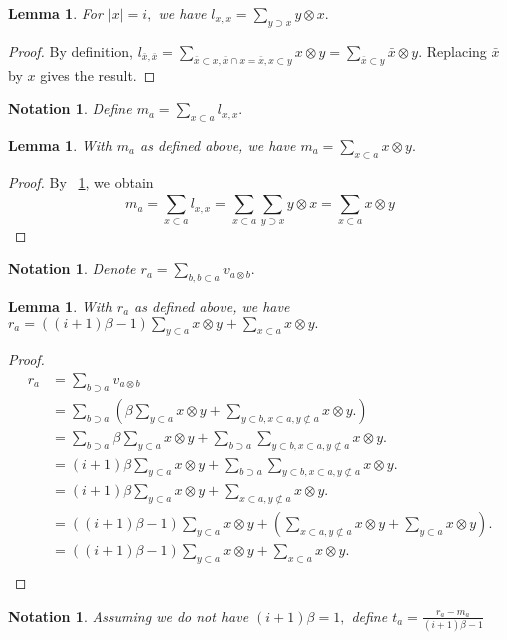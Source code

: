 \documentclass{amsart}
\newtheorem{lem}[subsubsection]{Lemma}
\newtheorem{note}[subsubsection]{Notation}
\begin{document}
\begin{lem}
\label{l_diag_equivalence}
For $|x| = i,$ we have $l_{x,x} = \sum_{y \supset x}^{}y\otimes x.$
\end{lem}
\begin{proof}
By definition, $l_{\bar x,\bar x} = \sum_{\bar x\subset x,\bar x \cap x = \bar x,x\subset y}^{}x\otimes y = \sum_{\bar x\subset y}^{}\bar x\otimes y.$ Replacing $\bar x$ by $x$ gives the result.
\end{proof}

\begin{note}
Define $m_a = \sum_{x \subset a}^{}l_{x,x}.$
\end{note}

\begin{lem}
\label{m_equivalence}
With $m_a$ as defined above, we have $m_a = \sum_{x\subset a}^{}x\otimes y.$
\end{lem}
\begin{proof}
By ~\ref{l_diag_equivalence}, we obtain
$$m_a = \sum_{x \subset a}^{}l_{x,x} = \sum_{x \subset a}^{}\sum_{y \supset x}^{}y\otimes x= \sum_{x\subset a}^{}x\otimes y$$
\end{proof}

\begin{note}
Denote $r_a = \sum_{b,b\subset a}^{} v_{a \otimes b}.$
\end{note}

\begin{lem}
\label{r_equivalence}
With $r_a$ as defined above, we have $r_a = ((i+1)\beta-1)\sum_{y\subset a}^{}x\otimes y +\sum_{x\subset a}^{}x\otimes y.$
\end{lem}
\begin{proof}
\begin{align*}
	r_a &= \sum_{b\supset a}^{}v_{a\otimes b}\\
	&=\sum_{b\supset a}^{} \left(\beta \sum_{y \subset a}^{}x \otimes y + \sum_{y\subset b,x \subset a,y\not\subset a}^{}x\otimes y.\right)\\
	&= \sum_{b\supset a}^{} \beta \sum_{y \subset a}^{}x \otimes y + \sum_{b\supset a}^{} \sum_{y\subset b,x \subset a,y\not\subset a}^{}x\otimes y.\\
	&= (i+1)\beta \sum_{y \subset a}^{}x \otimes y + \sum_{b\supset a}^{} \sum_{y\subset b,x \subset a,y\not\subset a}^{}x\otimes y.\\
	&= (i+1)\beta \sum_{y \subset a}^{}x \otimes y + \sum_{x \subset a,y\not\subset a}^{}x\otimes y.\\
	&= ((i+1)\beta-1) \sum_{y \subset a}^{}x \otimes y + \left( \sum_{x \subset a,y\not\subset a}^{}x\otimes y+\sum_{y \subset a}^{}x \otimes y\right).\\
	&= ((i+1)\beta-1) \sum_{y \subset a}^{}x \otimes y + \sum_{x \subset a}^{}x\otimes y.\\
\end{align*}
\end{proof}
\begin{note}
Assuming we do not have $(i+1)\beta = 1,$ define $t_a = \frac{r_a - m_a}{(i+1)\beta - 1}$
\end{note}
\end{document}

